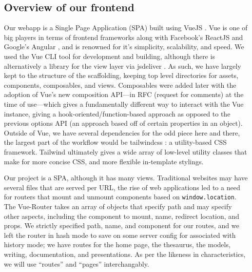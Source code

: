 \documentclass[11pt, twoside, reqno]{book}
\begin{document}
\subsection{Overview of our frontend}

Our webapp is a Single Page Application (SPA) built using VueJS \cite{Vuejs17:online}. Vue is one of big players in terms of frontend frameworks along with Facebook's ReactJS \cite{React-AJ42:online} and Google's Angular \cite{Angular31:online}, and is renowned for it's simplicity, scalability, and speed. We used the Vue CLI tool for development and building, although there is alternatively a library for the view layer via jsdeliver \cite{httpscdn6:online}. As such, we have largely kept to the structure of the scaffolding, keeping top level directories for assets, components, composables, and views. Composables were added later with the adoption of Vue's new composition API—in RFC (request for comments) at the time of use—which gives a fundamentally different way to interact with the Vue instance, giving a hook-oriented/function-based approach as opposed to the previous options API (an approach based off of certain properties in an object). Outside of Vue, we have several dependencies for the odd piece here and there, the largest part of the workflow would be tailwindcss \cite{Tailwind13:online}: a utility-based CSS framework. Tailwind ultimately gives a wide array of low-level utility classes that make for more concise CSS, and more flexible in-template stylings.

Our project is a SPA, although it has many views. Traditional websites may have several files that are served per URL, the rise of web applications led to a need for routers that mount and unmount components based on \texttt{window.location}. The Vue-Router takes an array of objects that specify path and may specify other aspects, including the component to mount, name, redirect location, and props. We strictly specified path, name, and component for our routes, and we left the router in hash mode to save on some server config for associated with history mode; we have routes for the home page, the thesaurus, the models, writing, documentation, and presentations. As per the likeness in characteristics, we will use ``routes'' and ``pages'' interchangably.
\end{document}
